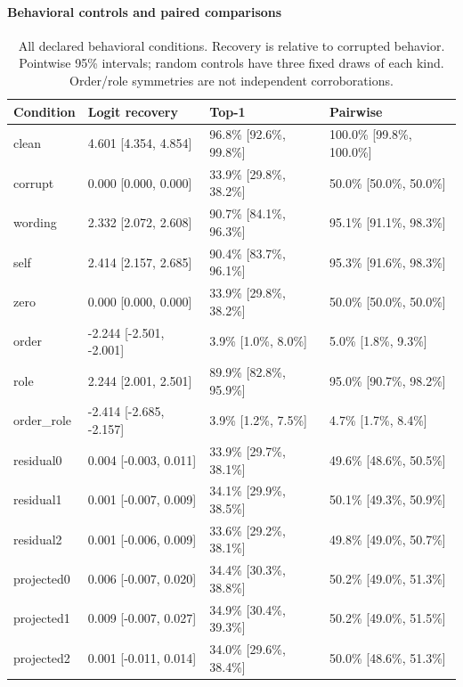 \paragraph{Behavioral controls and paired comparisons}

\begin{table}[htbp]
\centering\footnotesize
\caption{All declared behavioral conditions. Recovery is relative to corrupted behavior. Pointwise 95\% intervals; random controls have three fixed draws of each kind. Order/role symmetries are not independent corroborations.}
\label{tab:b007-behavior}
\begin{tabularx}{\linewidth}{@{}YYYY@{}}
\toprule
Condition & Logit recovery & Top-1 & Pairwise \\
\midrule
clean & 4.601 [4.354, 4.854] & 96.8\% [92.6\%, 99.8\%] & 100.0\% [99.8\%, 100.0\%] \\
corrupt & 0.000 [0.000, 0.000] & 33.9\% [29.8\%, 38.2\%] & 50.0\% [50.0\%, 50.0\%] \\
wording & 2.332 [2.072, 2.608] & 90.7\% [84.1\%, 96.3\%] & 95.1\% [91.1\%, 98.3\%] \\
self & 2.414 [2.157, 2.685] & 90.4\% [83.7\%, 96.1\%] & 95.3\% [91.6\%, 98.3\%] \\
zero & 0.000 [0.000, 0.000] & 33.9\% [29.8\%, 38.2\%] & 50.0\% [50.0\%, 50.0\%] \\
order & -2.244 [-2.501, -2.001] & 3.9\% [1.0\%, 8.0\%] & 5.0\% [1.8\%, 9.3\%] \\
role & 2.244 [2.001, 2.501] & 89.9\% [82.8\%, 95.9\%] & 95.0\% [90.7\%, 98.2\%] \\
order\_role & -2.414 [-2.685, -2.157] & 3.9\% [1.2\%, 7.5\%] & 4.7\% [1.7\%, 8.4\%] \\
residual0 & 0.004 [-0.003, 0.011] & 33.9\% [29.7\%, 38.1\%] & 49.6\% [48.6\%, 50.5\%] \\
residual1 & 0.001 [-0.007, 0.009] & 34.1\% [29.9\%, 38.5\%] & 50.1\% [49.3\%, 50.9\%] \\
residual2 & 0.001 [-0.006, 0.009] & 33.6\% [29.2\%, 38.1\%] & 49.8\% [49.0\%, 50.7\%] \\
projected0 & 0.006 [-0.007, 0.020] & 34.4\% [30.3\%, 38.8\%] & 50.2\% [49.0\%, 51.3\%] \\
projected1 & 0.009 [-0.007, 0.027] & 34.9\% [30.4\%, 39.3\%] & 50.2\% [49.0\%, 51.5\%] \\
projected2 & 0.001 [-0.011, 0.014] & 34.0\% [29.6\%, 38.4\%] & 50.0\% [48.6\%, 51.3\%] \\
\bottomrule
\end{tabularx}
\end{table}

